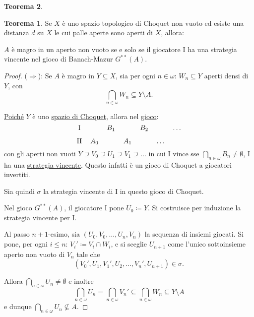 \documentclass[titlepage]{article}
\newcommand{\1}{\mathds{1}}
\theoremstyle{definition}%
\newtheorem{thm}{Teorema}[section]
\theoremstyle{plain}
\theoremstyle{remark}
\begin{document}
\begin{thm}
\begin{thm}\label{sec:orged1da91}
Se \(X\) è uno {spazio topologico} {di Choquet} non {vuoto} ed esiste una {distanza} \(d\) su \(X\) le cui {palle aperte} sono aperti di \(X\), allora:

\(A\) è {magro} in un {aperto} non vuoto se e solo se il giocatore I ha una {strategia vincente} nel {gioco di Banach-Mazur} \(G^{**}(A)\).
\end{thm}
\begin{proof}
(\(\Rightarrow\)): Se \(A\) è magro in \(Y \subseteq X\), sia per ogni \(n \in \omega\): \(W_{n} \subseteq Y\) aperti densi di \(Y\), con
\begin{equation*}
\bigcap_{n \in\omega} W_{n} \subseteq Y \setminus A.
\end{equation*}

\hyperref[sec:orge945bdd]{Poiché} \(Y\) è uno \hyperref[sec:org12a4e1c]{spazio di Choquet}, allora nel \hyperref[sec:org21a45cb]{gioco}:
\begin{equation*}
\begin{tikzcd}[ampersand replacement=\&,cramped, sep=tiny]
	{\text{I}} \&\& {B_1} \&\& {B_2} \&\& \dots \\
	{\text{II}} \& {A_0} \&\& {A_1} \&\& \dots
\end{tikzcd}
\end{equation*}
con gli aperti non vuoti \(Y\supseteq V_{0}\supseteq U_{1}\supseteq V_{1}\supseteq \dots\) in cui I vince sse \(\bigcap_{n \in \omega}{B_{n}} \neq \emptyset\), I ha una \hyperref[sec:org1db90c5]{strategia vincente}. Questo infatti è un gioco di Choquet a giocatori invertiti.

Sia quindi \(\sigma\) la strategia vincente di I in questo gioco di Choquet.

Nel gioco \(G^{**}(A)\), il giocatore I pone \(U_{0} \coloneqq Y\). Si costruisce per induzione la strategia vincente per I.

Al passo \(n+1\)-esimo, sia \((U_{0},V_{0},\dots, U_{n}, V_{n})\) la sequenza di insiemi giocati. Si pone, per ogni \(i\le n\): \(V_{i}'\coloneqq V_{i}\cap W_{i}\), e si sceglie \(U_{n+1}\) come l'unico sottoinsieme aperto non vuoto di \(V_{n}\) tale che
\begin{equation*}
(V_{0}', U_{1}, V_{1}', U_{2},\dots, V_{n}', U_{n+1}) \in\sigma.
\end{equation*}

Allora \(\bigcap_{n \in \omega} U_{n}\neq\emptyset\) e inoltre
\begin{equation*}
\bigcap_{n \in\omega} U_{n} = \bigcap_{n \in\omega} V_{n}' \subseteq \bigcap_{n \in \omega} W_{n} \subseteq Y\setminus A
\end{equation*}
e dunque \(\bigcap_{n \in\omega} U_{n} \not\subseteq A\).


\end{proof}
\end{thm}
\end{document}
